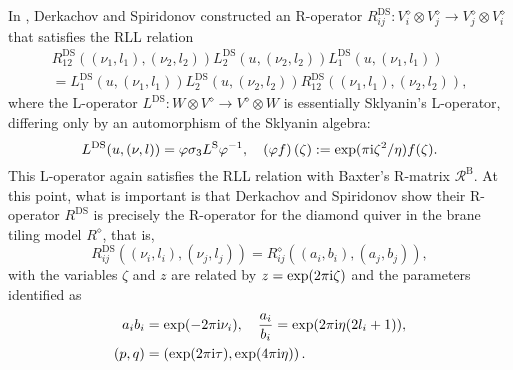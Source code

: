 In \cite{Derkachov:2012iv}, Derkachov and Spiridonov constructed
an R-operator $R_{ij}^{\mathrm{DS}}:V_{i}^{\diamond}\otimes V_{j}^{\diamond}\rightarrow V_{j}^{\diamond}\otimes V_{i}^{\diamond}$
that satisfies the RLL relation
\begin{multline}
    R_{12}^{\mathrm{DS}}((\nu_{1},l_{1}),(\nu_{2},l_{2}))
    L_{2}^{\mathrm{DS}}(u,(\nu_{2},l_{2}))
    L_{1}^{\mathrm{DS}}(u,(\nu_{1},l_{1}))    \\
      =
        L_{1}^{\mathrm{DS}}(u,(\nu_{1},l_{1}))
        L_{2}^{\mathrm{DS}}(u,(\nu_{2},l_{2}))
        R_{12}^{\mathrm{DS}}((\nu_{1},l_{1}),(\nu_{2},l_{2})),
\end{multline}
where the L-operator $L^{\mathrm{DS}}:W\otimes V^{\diamond}\to V^{\diamond}\otimes W$
is essentially Sklyanin's L-operator, differing only by an automorphism
of the Sklyanin algebra:
\begin{equation}
    L^{\mathrm{DS}}(u,(\nu,l))
      =  \varphi  \sigma_{3}  L^{\mathrm{S}}\varphi^{-1},
        \quad  \left(\varphi f\right)(\zeta)  :=  \exp(\pi \mathrm{i} \zeta^{2}/\eta)f(\zeta).
\end{equation}
This L-operator again satisfies the RLL relation with Baxter's R-matrix
$\mathcal{R}^{\mathrm{B}}$. At this point, what is important is that
Derkachov and Spiridonov show their R-operator $R^{\mathrm{DS}}$ is precisely the R-operator
for the diamond quiver in the brane tiling model $R^{\diamond}$,
that is,
\begin{equation}
    R_{ij}^{\mathrm{DS}}((\nu_{i},l_{i}),(\nu_{j},l_{j}))
      =
        R_{ij}^{\diamond}((a_{i},b_{i}),(a_{j},b_{j})),
\end{equation}
with the variables $\zeta$ and $z$ are related by $z=\exp(2\pi \mathrm{i} \zeta)$
and the parameters identified as
\begin{align}
  a_{i} b_{i} &  =  \exp(-2\pi \mathrm{i} \nu_{i}),  \quad  \frac{a_{i}}{b_{i}}  =  \exp(2\pi \mathrm{i}\eta(2l_{i}+1)),  \\
  (p,q)       &  =  \left(\exp(2\pi \mathrm{i}\tau),\exp(4\pi \mathrm{i}\eta)\right).
\end{align}

